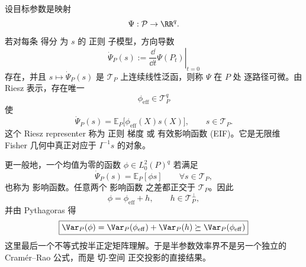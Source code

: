 \begin{definition}[逐路径可微与有效影响函数]
设目标参数是映射
\[
\Psi:\mathcal P\to\RR^q.
\]
若对每条 得分 为 $s$ 的 正则 子模型，方向导数
\[
\dot\Psi_P(s)
:=\left.\frac{\dd}{\dd t}\Psi(P_t)\right|_{t=0}
\]
存在，并且 $s\mapsto\dot\Psi_P(s)$ 是 $\mathcal T_P$ 上连续线性泛函，则称 $\Psi$ 在 $P$ 处 逐路径可微。由 Riesz 表示，存在唯一
\[
\phi_{\mathrm{eff}}
\in\mathcal T_P^q
\]
使
\begin{equation*}\boxed{
\dot\Psi_P(s)
=
\mathbb E_P\bigl[\phi_{\mathrm{eff}}(X)s(X)\bigr],
\qquad s\in\mathcal T_P.
}\end{equation*}
这个 Riesz representer 称为 正则 梯度 或 有效影响函数 (EIF)。它是无限维 Fisher 几何中真正对应于 $I^{-1}s$ 的对象。
\end{definition}

\begin{proposition}[影响函数的正交分解与效率界]
更一般地，一个均值为零的函数 $\phi\in L_0^2(P)^q$ 若满足
\[
\dot\Psi_P(s)
=
\mathbb E_P[\phi s]
\qquad\forall s\in\mathcal T_P,
\]
也称为 影响函数。任意两个 影响函数 之差都正交于 $\mathcal T_P$。因此
\[
\phi
=\phi_{\mathrm{eff}}+h,
\qquad h\in\mathcal T_P^\perp,
\]
并由 Pythagoras 得
\begin{equation}
\boxed{
\Var_P(\phi)
=
\Var_P(\phi_{\mathrm{eff}})
+\Var_P(h)
\succeq
\Var_P(\phi_{\mathrm{eff}})
}
\label{eq:math-stat-semiparametric-efficiency-bound}
\end{equation}
这里最后一个不等式按半正定矩阵理解。于是半参数效率界不是另一个独立的 Cramér--Rao 公式，而是 切-空间 正交投影的直接结果。
\end{proposition}


